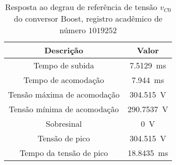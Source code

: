 \begin{table}[!ht]
\centering
\caption{Resposta ao degrau de referência de tensão $v_{C0}$ do conversor Boost, registro acadêmico de número $1019252$}
\label{tab:parametros}
\begin{tabular}{@{}cc@{}}
\toprule
\textbf{Descrição} & \textbf{Valor}\\ \midrule
Tempo de subida & \SI{7.5129}{\milli\s}\\
Tempo de acomodação & \SI{7.944}{\milli\s}\\
Tensão máxima de acomodação & \SI{304.515}{\V}\\
Tensão mínima de acomodação & \SI{290.7537}{\V}\\
Sobresinal & \SI{0}{\V}\\
Tensão de pico & \SI{304.515}{\V}\\
Tempo da tensão de pico & \SI{18.8435}{\milli\s}\\
\bottomrule
\end{tabular}
\end{table}

